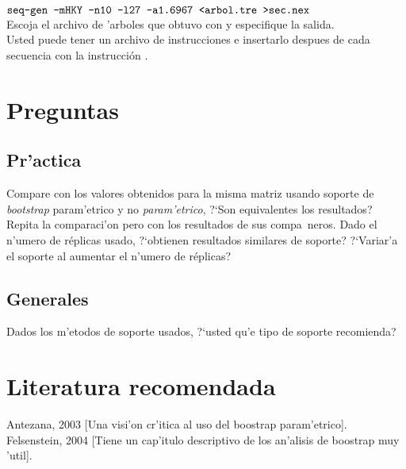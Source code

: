 \begin{math}
\texttt{seq-gen -mHKY -n10 -l27 -a1.6967 <arbol.tre >sec.nex}
\end{math}\\ 

Escoja el archivo de 'arboles que obtuvo con  y especifique la salida.\\
Usted puede tener un archivo de instrucciones e insertarlo despues de cada secuencia con la instrucci\'on .
\section{Preguntas}
\subsection{Pr'actica}
\noindent
Compare con los valores obtenidos para la misma matriz usando soporte de \textit{bootstrap} param'etrico y no \textit{param'etrico}, ?`Son equivalentes los resultados?\\
Repita la comparaci'on pero con los resultados de sus compa~neros. Dado el n'umero de r\'eplicas usado, ?`obtienen resultados similares de soporte? ?`Variar'a el soporte al aumentar el n'umero de r\'eplicas?
\subsection{Generales}
\noindent
Dados los m'etodos de soporte usados, ?`usted qu'e tipo de soporte recomienda?
\section{Literatura recomendada}
\noindent
Antezana, 2003 [Una visi'on cr'itica al uso del boostrap param'etrico].\\
Felsenstein, 2004 [Tiene un cap'itulo descriptivo de los an'alisis de boostrap muy 'util].